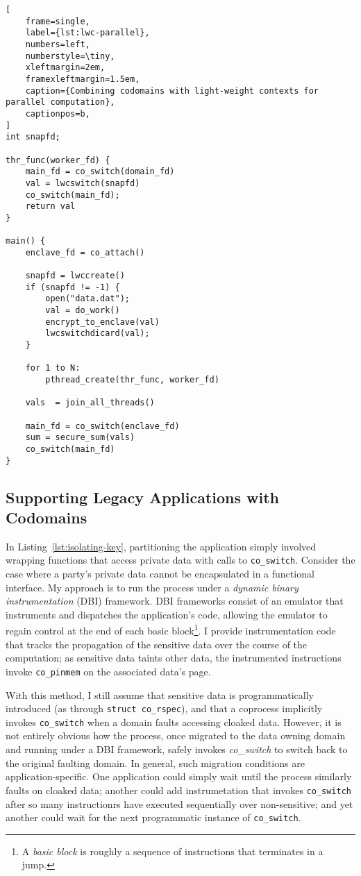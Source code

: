 \begin{lstlisting}[
    frame=single,
    label={lst:lwc-parallel},
    numbers=left,
    numberstyle=\tiny,
    xleftmargin=2em,
    framexleftmargin=1.5em,
    caption={Combining codomains with light-weight contexts for parallel computation},
    captionpos=b,
]
int snapfd;

thr_func(worker_fd) {
    main_fd = co_switch(domain_fd)
    val = lwcswitch(snapfd)
    co_switch(main_fd);
    return val
}

main() {
    enclave_fd = co_attach()

    snapfd = lwccreate()
    if (snapfd != -1) {
        open("data.dat");
        val = do_work()
        encrypt_to_enclave(val)
        lwcswitchdicard(val);
    } 

    for 1 to N:
        pthread_create(thr_func, worker_fd)
            
    vals  = join_all_threads()
     
    main_fd = co_switch(enclave_fd)
    sum = secure_sum(vals)
    co_switch(main_fd)
}
\end{lstlisting}


\subsection{Supporting Legacy Applications with Codomains}
\label{sec:codomains-legacy-apps}

In Listing~\ref{lst:isolating-key}, partitioning the application simply
involved wrapping functions that access private data with calls to
\texttt{co\_switch}.
%
Consider the case where a party's private data cannot be encapsulated in a
functional interface.
%
My approach is to run the process under a \emph{dynamic binary
instrumentation} (DBI) framework.
%
DBI frameworks consist of an emulator that instruments and dispatches the
application's code, allowing the emulator to regain control at the end of each
basic block\footnote{A \emph{basic block} is roughly a sequence of instructions
that terminates in a jump.}.
%
I provide instrumentation code that tracks the propagation of the sensitive
data over the course of the computation; as sensitive data taints other data,
the instrumented instructions invoke \texttt{co\_pinmem} on the associated
data's page.


With this  method, I still assume that sensitive data is programmatically
introduced (as through \texttt{struct co\_rspec}), and that a coprocess
implicitly invokes \texttt{co\_switch} when a domain faults accessing cloaked
data.
%
However, it is not entirely obvious how the process, once migrated to the data
owning domain and running under a DBI framework, safely invokes
\emph{co\_switch} to switch back to the original faulting domain.
%
In general, such migration conditions are application-specific.
%
One application could simply wait until the process similarly faults on
cloaked data; another could add instrumetation that invokes
\texttt{co\_switch} after so many instructionrs have executed sequentially over
non-sensitive; and yet another could wait for the next programmatic instance of
\texttt{co\_switch}.


